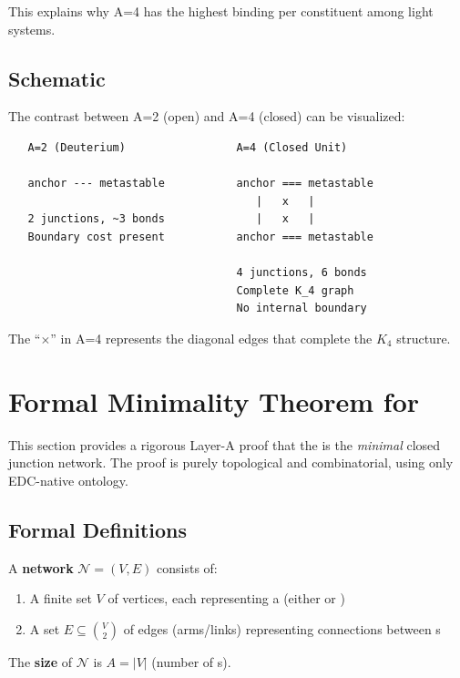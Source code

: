 This explains why A=4 has the highest binding per constituent
among light systems. \tagP

\subsection{Schematic}

The contrast between A=2 (open) and A=4 (closed) can be visualized:

\begin{center}
\begin{verbatim}
   A=2 (Deuterium)                 A=4 (Closed Unit)

   anchor --- metastable           anchor === metastable
                                      |   x   |
   2 junctions, ~3 bonds              |   x   |
   Boundary cost present           anchor === metastable

                                   4 junctions, 6 bonds
                                   Complete K_4 graph
                                   No internal boundary
\end{verbatim}
\end{center}

The ``$\times$'' in A=4 represents the diagonal edges that complete
the $K_4$ structure. \tagP

\section{Formal Minimality Theorem for \ClosedFour{}}
\label{sec:he4:minimality}

This section provides a rigorous Layer-A proof that the \ClosedFour{} is the
\emph{minimal} closed junction network. The proof is purely topological and
combinatorial, using only EDC-native ontology.

\subsection{Formal Definitions}
\label{sec:he4:min:def}

\begin{definition} \tagDef
    A \textbf{\Junction{} network} $\mathcal{N} = (V, E)$ consists of:
    \begin{enumerate}
        \item A finite set $V$ of vertices, each representing a \Junction{} (either
              \AnchorJunction{} or \MetastableJunction{})
        \item A set $E \subseteq \binom{V}{2}$ of edges (arms/links) representing
              \Pinning{} connections between \Junction{}s
    \end{enumerate}
    The \textbf{size} of $\mathcal{N}$ is $A = |V|$ (number of \Constituent{}s). \tagDef
\end{definition}

